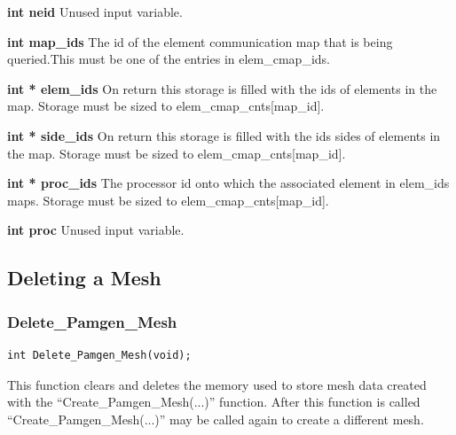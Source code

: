 {\setlength{\parindent}{0pt}
 \textbf{int neid} Unused input variable.}

{\setlength{\parindent}{0pt}
 \textbf{int map\_ids} The id of the element communication map that is being queried.This must be one of the entries in elem\_cmap\_ids.}

{\setlength{\parindent}{0pt}
 \textbf{int * elem\_ids} On return this storage is filled with the ids of elements in the map. Storage must be sized to elem\_cmap\_cnts[map\_id]. }

{\setlength{\parindent}{0pt}
 \textbf{int * side\_ids} On return this storage is filled with the ids sides of elements in the map. Storage must be sized to elem\_cmap\_cnts[map\_id]. }

{\setlength{\parindent}{0pt}
 \textbf{int * proc\_ids} The processor id onto which the associated element in elem\_ids maps. Storage must be sized to elem\_cmap\_cnts[map\_id].}

{\setlength{\parindent}{0pt}
 \textbf{int proc} Unused input variable.}

\clearpage
\subsection{Deleting a Mesh}

\subsubsection{Delete\_Pamgen\_Mesh}
{\ttfamily  \begin{verbatim}
int Delete_Pamgen_Mesh(void);
\end{verbatim}}
This function clears and deletes the memory used to store mesh data created with the ``Create\_Pamgen\_Mesh(...)'' function. After this function is called ``Create\_Pamgen\_Mesh(...)'' may be called again to create a different mesh.

